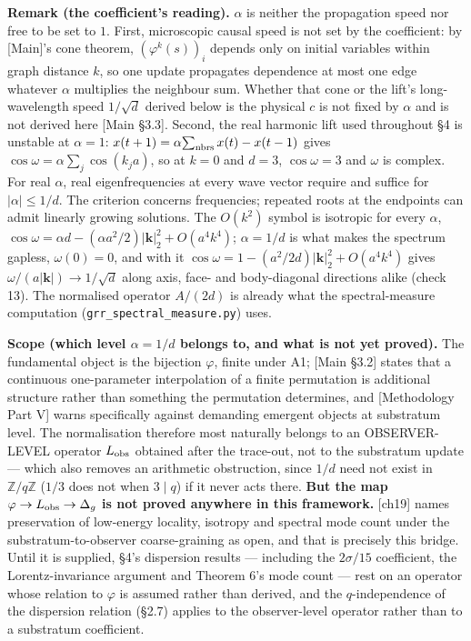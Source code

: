 \documentclass[
]{article}
\begin{document}
\textbf{Remark (the coefficient's reading).} \(\alpha\) is neither the
propagation speed nor free to be set to \(1\). First, microscopic causal
speed is not set by the coefficient: by {[}Main{]}'s cone theorem,
\((\varphi^k(s))_i\) depends only on initial variables within graph
distance \(k\), so one update propagates dependence at most one edge
whatever \(\alpha\) multiplies the neighbour sum. Whether that cone or
the lift's long-wavelength speed \(1/\sqrt d\) derived below is the
physical \(c\) is not fixed by \(\alpha\) and is not derived here
{[}Main §3.3{]}. Second, the real harmonic lift used throughout §4 is
unstable at \(\alpha=1\): \(x(t+1)=\alpha\!\sum_{\rm nbrs}x(t)-x(t-1)\)
gives \(\cos\omega=\alpha\sum_j\cos(k_ja)\), so at \(k=0\) and \(d=3\),
\(\cos\omega=3\) and \(\omega\) is complex. For real \(\alpha\), real
eigenfrequencies at every wave vector require and suffice for
\(|\alpha|\le1/d\). The criterion concerns frequencies; repeated roots
at the endpoints can admit linearly growing solutions. The \(O(k^2)\)
symbol is isotropic for every \(\alpha\),
\(\cos\omega=\alpha d-(\alpha a^2/2)|\mathbf k|_2^2+O(a^4k^4)\);
\(\alpha=1/d\) is what makes the spectrum gapless, \(\omega(0)=0\), and
with it \(\cos\omega=1-(a^2/2d)|\mathbf k|_2^2+O(a^4k^4)\) gives
\(\omega/(a|\mathbf k|)\to1/\sqrt d\) along axis, face- and
body-diagonal directions alike (check 13). The normalised operator
\(A/(2d)\) is already what the spectral-measure computation
(\texttt{grr\_spectral\_measure.py}) uses.

\textbf{Scope (which level \(\alpha=1/d\) belongs to, and what is not
yet proved).} The fundamental object is the bijection \(\varphi\),
finite under A1; {[}Main §3.2{]} states that a continuous one-parameter
interpolation of a finite permutation is additional structure rather
than something the permutation determines, and {[}Methodology Part V{]}
warns specifically against demanding emergent objects at substratum
level. The normalisation therefore most naturally belongs to an
OBSERVER-LEVEL operator \(L_{\rm obs}\) obtained after the trace-out,
not to the substratum update --- which also removes an arithmetic
obstruction, since \(1/d\) need not exist in \(\mathbb Z/q\mathbb Z\)
(\(1/3\) does not when \(3\mid q\)) if it never acts there. \textbf{But
the map \(\varphi\to L_{\rm obs}\to\Delta_g\) is not proved anywhere in
this framework.} {[}ch19{]} names preservation of low-energy locality,
isotropy and spectral mode count under the substratum-to-observer
coarse-graining as open, and that is precisely this bridge. Until it is
supplied, §4's dispersion results --- including the \(2\sigma/15\)
coefficient, the Lorentz-invariance argument and Theorem 6's mode count
--- rest on an operator whose relation to \(\varphi\) is assumed rather
than derived, and the \(q\)-independence of the dispersion relation
(§2.7) applies to the observer-level operator rather than to a
substratum coefficient.
\end{document}
